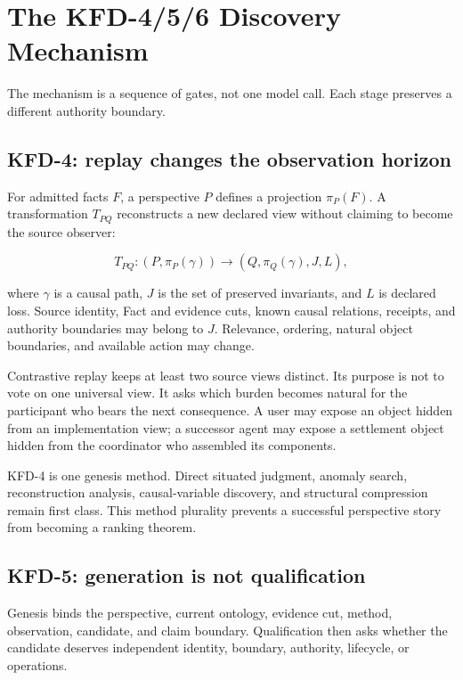\section{The KFD-4/5/6 Discovery Mechanism}
\label{sec:mechanism}

The mechanism is a sequence of gates, not one model call. Each stage preserves
a different authority boundary.

\subsection{KFD-4: replay changes the observation horizon}

For admitted facts $F$, a perspective $P$ defines a projection
$\pi_P(F)$. A transformation $T_{PQ}$ reconstructs a new declared view without
claiming to become the source observer:

\begin{equation}
T_{PQ}: (P, \pi_P(\gamma)) \rightarrow
(Q, \pi_Q(\gamma), J, L),
\end{equation}

where $\gamma$ is a causal path, $J$ is the set of preserved invariants, and
$L$ is declared loss. Source identity, Fact and evidence cuts, known causal
relations, receipts, and authority boundaries may belong to $J$. Relevance,
ordering, natural object boundaries, and available action may change.

Contrastive replay keeps at least two source views distinct. Its purpose is not
to vote on one universal view. It asks which burden becomes natural for the
participant who bears the next consequence. A user may expose an object hidden
from an implementation view; a successor agent may expose a settlement object
hidden from the coordinator who assembled its components.

KFD-4 is one genesis method. Direct situated judgment, anomaly search,
reconstruction analysis, causal-variable discovery, and structural compression
remain first class. This method plurality prevents a successful perspective
story from becoming a ranking theorem.

\subsection{KFD-5: generation is not qualification}

Genesis binds the perspective, current ontology, evidence cut, method,
observation, candidate, and claim boundary. Qualification then asks whether the
candidate deserves independent identity, boundary, authority, lifecycle, or
operations.

